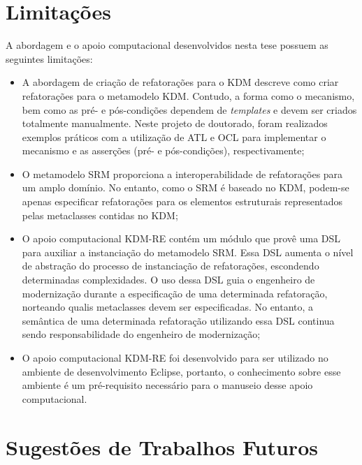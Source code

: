 \section{Limitações}\label{sec:limitacoes_trabalho}

A abordagem e o apoio computacional desenvolvidos nesta tese possuem as seguintes limitações:

\begin{itemize}

\item A abordagem de criação de refatorações para o KDM descreve como criar refatorações para o metamodelo KDM. Contudo, a forma como o mecanismo, bem como as pré- e pós-condições dependem de \textit{templates} e devem ser criados totalmente manualmente. Neste projeto de doutorado, foram realizados exemplos práticos com a utilização de ATL e OCL para implementar o mecanismo e as asserções (pré- e pós-condições), respectivamente;

\item O metamodelo SRM proporciona a interoperabilidade de refatorações para um amplo domínio. No entanto, como o SRM é baseado no KDM, podem-se apenas especificar refatorações para os elementos estruturais representados pelas metaclasses contidas no KDM;  


\item O apoio computacional KDM-RE contém um módulo que provê uma DSL para auxiliar a instanciação do metamodelo SRM. Essa DSL aumenta o nível de abstração do processo de instanciação de refatorações, escondendo determinadas complexidades. O uso dessa DSL guia o engenheiro de modernização durante a especificação de uma determinada refatoração, norteando qualis metaclasses devem ser especificadas. No entanto, a semântica de uma determinada refatoração utilizando essa DSL continua sendo responsabilidade do engenheiro de modernização;


\item O apoio computacional KDM-RE foi desenvolvido para ser utilizado no ambiente de desenvolvimento Eclipse, portanto, o conhecimento sobre esse ambiente é um pré-requisito necessário para o manuseio desse apoio computacional.
\end{itemize}

\section{Sugestões de Trabalhos Futuros}\label{sec:trabalhos_futuros_tese}

